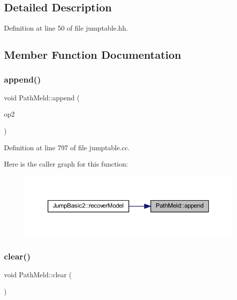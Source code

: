 \subsection{Detailed Description}


Definition at line 50 of file jumptable.\+hh.



\subsection{Member Function Documentation}
\mbox{\label{class_path_meld_a9e3817333b4f263c515375c88bb23199}} 
\subsubsection{\texorpdfstring{append()}{append()}}
{\footnotesize\ttfamily void Path\+Meld\+::append (\begin{DoxyParamCaption}\item[{const \mbox{\hyperlink{class_path_meld}{Path\+Meld}} \&}]{op2 }\end{DoxyParamCaption})}



Definition at line 797 of file jumptable.\+cc.

Here is the caller graph for this function\+:
\nopagebreak
\begin{figure}[H]
\begin{center}
\leavevmode
\includegraphics[width=344pt]{class_path_meld_a9e3817333b4f263c515375c88bb23199_icgraph}
\end{center}
\end{figure}
\mbox{\label{class_path_meld_a902af8ce7d496c1bcf34ed5e40b1be26}} 
\subsubsection{\texorpdfstring{clear()}{clear()}}
{\footnotesize\ttfamily void Path\+Meld\+::clear (\begin{DoxyParamCaption}\item[{void}]{ }\end{DoxyParamCaption})}



